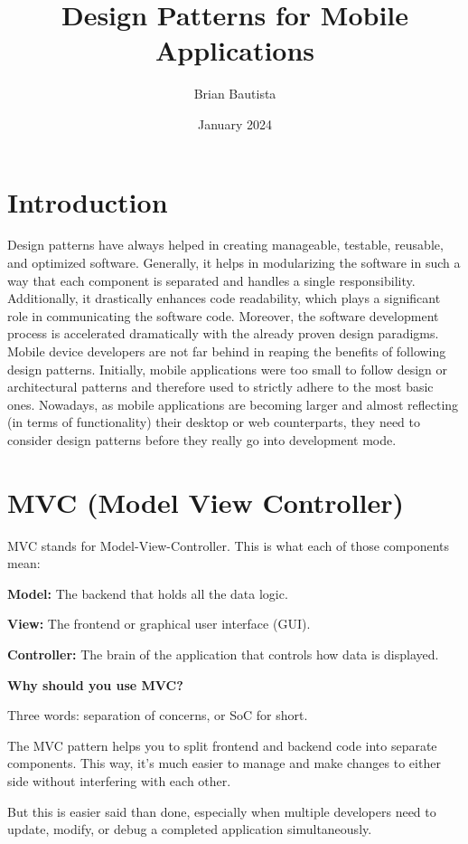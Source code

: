 \documentclass{article}
\title{Design Patterns for Mobile Applications}
\author{Brian Bautista}
\date{January 2024}
\begin{document}
\maketitle

\section{Introduction}
Design patterns have always helped in creating manageable, testable, reusable, and optimized software. Generally, it helps in modularizing the software in such a way that each component is separated and handles a single responsibility. Additionally, it drastically enhances code readability, which plays a significant role in communicating the software code. Moreover, the software development process is accelerated dramatically with the already proven design paradigms. Mobile device developers are not far behind in reaping the benefits of following design patterns. Initially, mobile applications were too small to follow design or architectural patterns and therefore used to strictly adhere to the most basic ones. Nowadays, as mobile applications are becoming larger and almost reflecting (in terms of functionality) their desktop or web counterparts, they need to consider design patterns before they really go into development mode.

\section{MVC (Model View Controller)}
MVC stands for Model-View-Controller. This is what each of those components mean:

\textbf{Model:} The backend that holds all the data logic.

\textbf{View:} The frontend or graphical user interface (GUI).

\textbf{Controller:} The brain of the application that controls how data is displayed.

\textbf{Why should you use MVC?}

Three words: separation of concerns, or SoC for short.

The MVC pattern helps you to split frontend and backend code into separate components. This way, it's much easier to manage and make changes to either side without interfering with each other.

But this is easier said than done, especially when multiple developers need to update, modify, or debug a completed application simultaneously.
\end{document}
